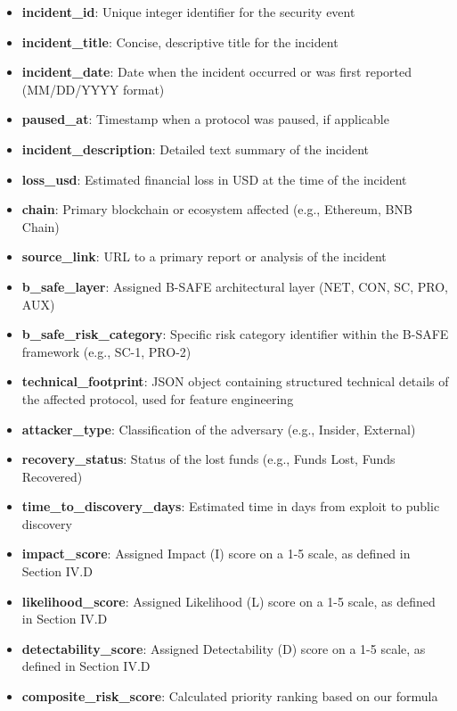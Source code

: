 \begin{itemize}
    \item \textbf{incident\_id}: Unique integer identifier for the security event
    \item \textbf{incident\_title}: Concise, descriptive title for the incident
    \item \textbf{incident\_date}: Date when the incident occurred or was first reported (MM/DD/YYYY format)
    \item \textbf{paused\_at}: Timestamp when a protocol was paused, if applicable
    \item \textbf{incident\_description}: Detailed text summary of the incident
    \item \textbf{loss\_usd}: Estimated financial loss in USD at the time of the incident
    \item \textbf{chain}: Primary blockchain or ecosystem affected (e.g., Ethereum, BNB Chain)
    \item \textbf{source\_link}: URL to a primary report or analysis of the incident
    \item \textbf{b\_safe\_layer}: Assigned B-SAFE architectural layer (NET, CON, SC, PRO, AUX)
    \item \textbf{b\_safe\_risk\_category}: Specific risk category identifier within the B-SAFE framework (e.g., SC-1, PRO-2)
    \item \textbf{technical\_footprint}: JSON object containing structured technical details of the affected protocol, used for feature engineering
    \item \textbf{attacker\_type}: Classification of the adversary (e.g., Insider, External)
    \item \textbf{recovery\_status}: Status of the lost funds (e.g., Funds Lost, Funds Recovered)
    \item \textbf{time\_to\_discovery\_days}: Estimated time in days from exploit to public discovery
    \item \textbf{impact\_score}: Assigned Impact (I) score on a 1-5 scale, as defined in Section IV.D
    \item \textbf{likelihood\_score}: Assigned Likelihood (L) score on a 1-5 scale, as defined in Section IV.D
    \item \textbf{detectability\_score}: Assigned Detectability (D) score on a 1-5 scale, as defined in Section IV.D
    \item \textbf{composite\_risk\_score}: Calculated priority ranking based on our formula
\end{itemize}

